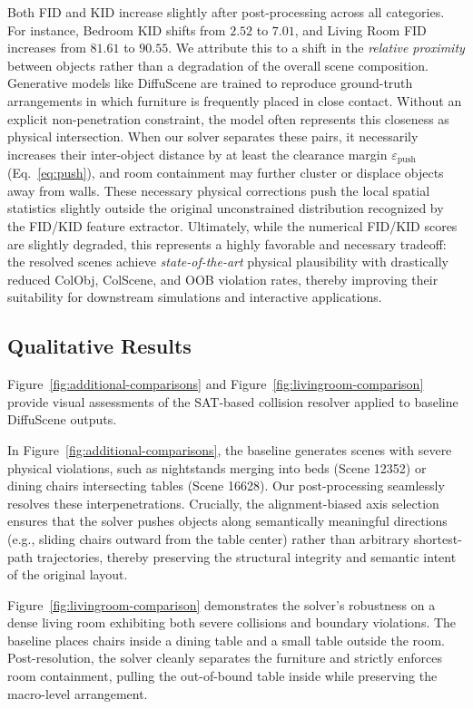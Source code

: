 Both FID and KID increase slightly after post-processing across all categories. For instance, Bedroom KID shifts from $2.52$ to $7.01$, and Living Room FID increases from $81.61$ to $90.55$. We attribute this to a shift in the \emph{relative proximity} between objects rather than a degradation of the overall scene composition. Generative models like DiffuScene are trained to reproduce ground-truth arrangements in which furniture is frequently placed in close contact. Without an explicit non-penetration constraint, the model often represents this closeness as physical intersection. When our solver separates these pairs, it necessarily increases their inter-object distance by at least the clearance margin $\varepsilon_{\mathrm{push}}$ (Eq.~\eqref{eq:push}), and room containment may further cluster or displace objects away from walls. These necessary physical corrections push the local spatial statistics slightly outside the original unconstrained distribution recognized by the FID/KID feature extractor. Ultimately, while the numerical FID/KID scores are slightly degraded, this represents a highly favorable and necessary tradeoff: the resolved scenes achieve \emph{state-of-the-art} physical plausibility with drastically reduced ColObj, ColScene, and OOB violation rates, thereby improving their suitability for downstream simulations and interactive applications.
\subsection{Qualitative Results}
\label{sec:exp:qual}

Figure~\ref{fig:additional-comparisons} and Figure~\ref{fig:livingroom-comparison} provide visual assessments of the SAT-based collision resolver applied to baseline DiffuScene outputs. 

In Figure~\ref{fig:additional-comparisons}, the baseline generates scenes with severe physical violations, such as nightstands merging into beds (Scene 12352) or dining chairs intersecting tables (Scene 16628). Our post-processing seamlessly resolves these interpenetrations. Crucially, the alignment-biased axis selection ensures that the solver pushes objects along semantically meaningful directions (e.g., sliding chairs outward from the table center) rather than arbitrary shortest-path trajectories, thereby preserving the structural integrity and semantic intent of the original layout.

Figure~\ref{fig:livingroom-comparison} demonstrates the solver's robustness on a dense living room exhibiting both severe collisions and boundary violations. The baseline places chairs inside a dining table and a small table outside the room. Post-resolution, the solver cleanly separates the furniture and strictly enforces room containment, pulling the out-of-bound table inside while preserving the macro-level arrangement.

